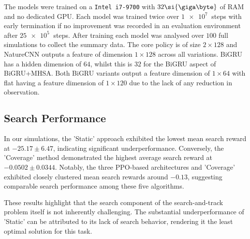 The models were trained on a \texttt{Intel i7-9700} with $32\si{\giga\byte}$ of RAM and no dedicated GPU. Each model was trained twice over $\SI{1e7}{}$ steps with early termination if no improvement was recorded in an evaluation environment after $\SI{25e5}{}$ steps. After training each model was analysed over $100$ full simulations to collect the summary data. The core policy is of size $2 \times 128$ and NatureCNN outputs a feature of dimension $1\times128$ across all variations. BiGRU has a hidden dimension of $64$, whilst this is $32$ for the BiGRU aspect of BiGRU+MHSA. Both BiGRU variants output a feature dimension of $1\times64$ with flat having a feature dimension of $1\times 120$ due to the lack of any reduction in observation.


\subsection{Search Performance}
\label{sect:results_search}


In our simulations, the 'Static' approach exhibited the lowest mean search reward at $-25.17 \pm 6.47$, indicating significant underperformance. Conversely, the 'Coverage' method demonstrated the highest average search reward at $-0.0502 \pm 0.0344$. Notably, the three PPO-based architectures and 'Coverage' exhibited closely clustered mean search rewards around $-0.13$, suggesting comparable search performance among these five algorithms.

These results highlight that the search component of the search-and-track problem itself is not inherently challenging. The substantial underperformance of 'Static' can be attributed to its lack of search behavior, rendering it the least optimal solution for this task.

